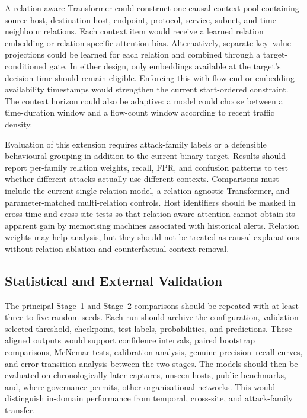 \documentclass[11pt,fleqn]{report}
\begin{document}
A relation-aware Transformer could construct one causal context pool containing source-host, destination-host, endpoint, protocol, service, subnet, and time-neighbour relations. Each context item would receive a learned relation embedding or relation-specific attention bias. Alternatively, separate key--value projections could be learned for each relation and combined through a target-conditioned gate. In either design, only embeddings available at the target's decision time should remain eligible. Enforcing this with flow-end or embedding-availability timestamps would strengthen the current start-ordered constraint. The context horizon could also be adaptive: a model could choose between a time-duration window and a flow-count window according to recent traffic density.

Evaluation of this extension requires attack-family labels or a defensible behavioural grouping in addition to the current binary target. Results should report per-family relation weights, recall, FPR, and confusion patterns to test whether different attacks actually use different contexts. Comparisons must include the current single-relation model, a relation-agnostic Transformer, and parameter-matched multi-relation controls. Host identifiers should be masked in cross-time and cross-site tests so that relation-aware attention cannot obtain its apparent gain by memorising machines associated with historical alerts. Relation weights may help analysis, but they should not be treated as causal explanations without relation ablation and counterfactual context removal.

\subsection{Statistical and External Validation}
\label{subsubsec:future_validation}

The principal Stage~1 and Stage~2 comparisons should be repeated with at least three to five random seeds. Each run should archive the configuration, validation-selected threshold, checkpoint, test labels, probabilities, and predictions. These aligned outputs would support confidence intervals, paired bootstrap comparisons, McNemar tests, calibration analysis, genuine precision--recall curves, and error-transition analysis between the two stages. The models should then be evaluated on chronologically later captures, unseen hosts, public benchmarks, and, where governance permits, other organisational networks. This would distinguish in-domain performance from temporal, cross-site, and attack-family transfer.
\end{document}
